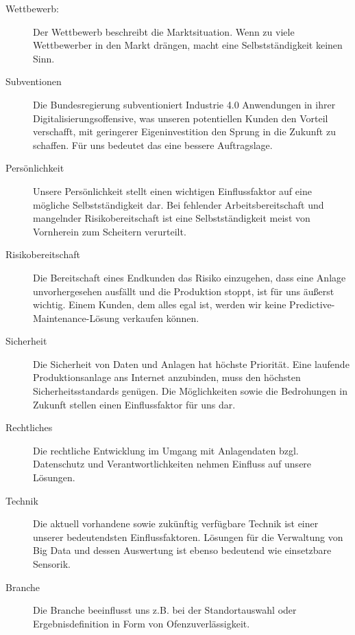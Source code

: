 \begin{description}
\item[Wettbewerb:]{Der Wettbewerb beschreibt die Marktsituation. Wenn zu viele Wettbewerber in den Markt drängen, macht eine Selbstständigkeit keinen Sinn.}

\item[Subventionen]{Die Bundesregierung subventioniert Industrie 4.0 Anwendungen in ihrer Digitalisierungsoffensive, was unseren potentiellen Kunden den Vorteil verschafft, mit geringerer Eigeninvestition den Sprung in die Zukunft zu schaffen. Für uns bedeutet das eine bessere Auftragslage.}

\item[Persönlichkeit]{Unsere Persönlichkeit stellt einen wichtigen Einflussfaktor auf eine mögliche Selbstständigkeit dar. Bei fehlender Arbeitsbereitschaft und mangelnder Risikobereitschaft ist eine Selbstständigkeit meist von Vornherein zum Scheitern verurteilt.}

\item[Risikobereitschaft]{Die Bereitschaft eines Endkunden das Risiko einzugehen, dass eine Anlage unvorhergesehen ausfällt und die Produktion stoppt, ist für uns äußerst wichtig. Einem Kunden, dem alles egal ist, werden wir keine Predictive-Maintenance-Lösung verkaufen können.}

\item[Sicherheit]{Die Sicherheit von Daten und Anlagen hat höchste Priorität. Eine laufende Produktionsanlage ans Internet anzubinden, muss den höchsten Sicherheitsstandards genügen. Die Möglichkeiten sowie die Bedrohungen in Zukunft stellen einen Einflussfaktor für uns dar.}

\item[Rechtliches]{Die rechtliche Entwicklung im Umgang mit Anlagendaten bzgl. Datenschutz und Verantwortlichkeiten nehmen Einfluss auf unsere Lösungen.}

\item[Technik]{Die aktuell vorhandene sowie zukünftig verfügbare Technik ist einer unserer bedeutendsten Einflussfaktoren. Lösungen für die Verwaltung von Big Data und dessen Auswertung ist ebenso bedeutend wie einsetzbare Sensorik.}

\item[Branche]{Die Branche beeinflusst uns z.B. bei der Standortauswahl oder Ergebnisdefinition in Form von Ofenzuverlässigkeit.}
\end{description}

